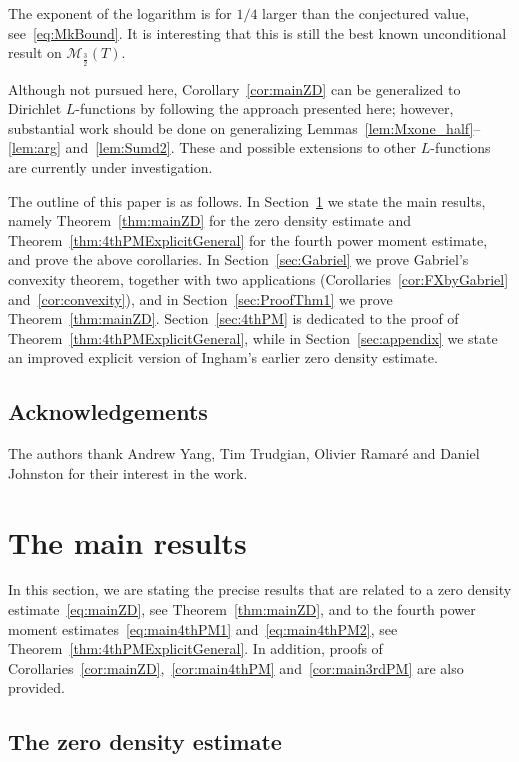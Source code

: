 \documentclass[a4paper,reqno]{amsart}
\theoremstyle{definition}
\begin{document}
The exponent of the logarithm is for $1/4$ larger than the conjectured value, see~\eqref{eq:MkBound}. It is interesting that this is still the best known unconditional result on $\mathcal{M}_{\frac{3}{2}}(T)$.

Although not pursued here, Corollary~\ref{cor:mainZD} can be generalized to Dirichlet $L$-functions by following the approach presented here; however, substantial work should be done on generalizing Lemmas~\ref{lem:Mxone_half}--\ref{lem:arg} and~\ref{lem:Sumd2}. These and possible extensions to other $L$-functions are currently under investigation.

The outline of this paper is as follows. In Section~\ref{sec:MainResults} we state the main results, namely Theorem~\ref{thm:mainZD} for the zero density estimate and Theorem~\ref{thm:4thPMExplicitGeneral} for the fourth power moment estimate, and prove the above corollaries. In Section~\ref{sec:Gabriel} we prove Gabriel's convexity theorem, together with two applications (Corollaries~\ref{cor:FXbyGabriel} and~\ref{cor:convexity}), and in Section~\ref{sec:ProofThm1} we prove Theorem~\ref{thm:mainZD}. Section~\ref{sec:4thPM} is dedicated to the proof of Theorem~\ref{thm:4thPMExplicitGeneral}, while in Section~\ref{sec:appendix} we state an improved explicit version of Ingham's earlier zero density estimate.

\subsection*{Acknowledgements} The authors thank Andrew Yang, Tim Trudgian, Olivier Ramar\'{e} and Daniel Johnston for their interest in the work.

\section{The main results}
\label{sec:MainResults}

In this section, we are stating the precise results that are related to a zero density estimate~\eqref{eq:mainZD}, see Theorem~\ref{thm:mainZD}, and to the fourth power moment estimates~\eqref{eq:main4thPM1} and~\eqref{eq:main4thPM2}, see Theorem~\ref{thm:4thPMExplicitGeneral}. In addition, proofs of Corollaries~\ref{cor:mainZD},~\ref{cor:main4thPM} and~\ref{cor:main3rdPM} are also provided.

\subsection{The zero density estimate}
\label{subsec:ZD}
\end{document}
